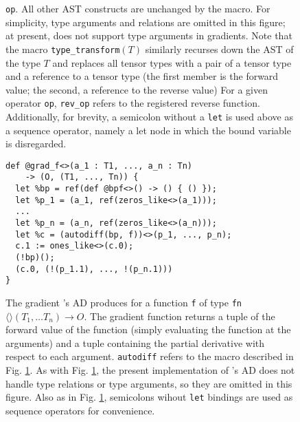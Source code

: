\begin{figure}
{      \texttt{op}.
    All other AST constructs are unchanged by the macro.
    For simplicity, type arguments and relations
      are omitted in this figure;
      at present, \relay does not
      support type arguments in gradients.
    Note that the macro \texttt{type\_transform}$(T)$
      similarly recurses down the AST of the type $T$
      and replaces all tensor types with a
      pair of a tensor type
      and a reference to a tensor type
      (the first member is the forward value;
      the second, a reference to the reverse value)
    For a given operator \texttt{op},
      \texttt{rev\_op} refers to the registered reverse function.
    Additionally, for brevity,
      a semicolon without a \texttt{let}
      is used above as a sequence operator,
      namely a let node in which the bound
      variable is disregarded.}
  \label{fig:ad-expr-transform}
\end{figure}

\begin{figure}
  \begin{verbatim}
def @grad_f<>(a_1 : T1, ..., a_n : Tn)
    -> (O, (T1, ..., Tn)) {
  let %bp = ref(def @bpf<>() -> () { () });
  let %p_1 = (a_1, ref(zeros_like<>(a_1)));
  ...
  let %p_n = (a_n, ref(zeros_like<>(a_n)));
  let %c = (autodiff(bp, f))<>(p_1, ..., p_n);
  c.1 := ones_like<>(c.0);
  (!bp)();
  (c.0, (!(p_1.1), ..., !(p_n.1)))
}
  \end{verbatim}
  \caption{The gradient \relay{}'s AD produces
    for a function \texttt{f} of type
    \texttt{fn}$\langle\rangle(T_1, \ldots T_n) \rightarrow O$.
  The gradient function returns a tuple of
    the forward value of the function
    (simply evaluating the function at the arguments)
    and a tuple containing the
    partial derivative with respect to each argument.
  \texttt{autodiff} refers to the macro described in
    Fig. \ref{fig:ad-expr-transform}.
  As with Fig. \ref{fig:ad-expr-transform},
    the present implementation of
    \relay{}'s AD does not handle type relations or type arguments,
    so they are omitted in this figure.
  Also as in Fig. \ref{fig:ad-expr-transform},
    semicolons wihout \texttt{let} bindings
    are used as sequence operators for convenience.}
  \label{fig:ad-gradient}
\end{figure}
